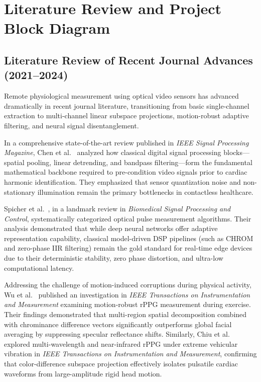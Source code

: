 \documentclass[11pt,a4paper]{report}
\begin{document}
\chapter{Literature Review and Project Block Diagram}

\section{Literature Review of Recent Journal Advances (2021--2024)}
Remote physiological measurement using optical video sensors has advanced dramatically in recent journal literature, transitioning from basic single-channel extraction to multi-channel linear subspace projections, motion-robust adaptive filtering, and neural signal disentanglement.

In a comprehensive state-of-the-art review published in \emph{IEEE Signal Processing Magazine}, Chen et al.~\cite{chen2021facial} analyzed how classical digital signal processing blocks---spatial pooling, linear detrending, and bandpass filtering---form the fundamental mathematical backbone required to pre-condition video signals prior to cardiac harmonic identification. They emphasized that sensor quantization noise and non-stationary illumination remain the primary bottlenecks in contactless healthcare.

Spicher et al.~\cite{spicher2024review}, in a landmark review in \emph{Biomedical Signal Processing and Control}, systematically categorized optical pulse measurement algorithms. Their analysis demonstrated that while deep neural networks offer adaptive representation capability, classical model-driven DSP pipelines (such as CHROM and zero-phase IIR filtering) remain the gold standard for real-time edge devices due to their deterministic stability, zero phase distortion, and ultra-low computational latency.

Addressing the challenge of motion-induced corruptions during physical activity, Wu et al.~\cite{wu2023motion} published an investigation in \emph{IEEE Transactions on Instrumentation and Measurement} examining motion-robust rPPG measurement during exercise. Their findings demonstrated that multi-region spatial decomposition combined with chrominance difference vectors significantly outperforms global facial averaging by suppressing specular reflectance shifts. Similarly, Chiu et al.~\cite{chiu2023deep} explored multi-wavelength and near-infrared rPPG under extreme vehicular vibration in \emph{IEEE Transactions on Instrumentation and Measurement}, confirming that color-difference subspace projection effectively isolates pulsatile cardiac waveforms from large-amplitude rigid head motion.
\end{document}
